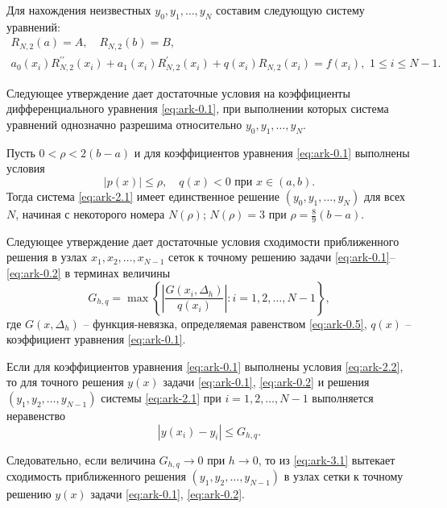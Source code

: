 Для нахождения неизвестных $y_0,y_1,\dots,y_N$ составим следующую систему уравнений:
\begin{equation}\label{eq:ark-2.1}
\begin{array}{lcl}
R_{N,2}(a)=A, \quad R_{N,2}(b)=B,\\
a_0(x_i)R^{\prime\prime}_{N,2}(x_i)+a_1(x_i)R^\prime_{N,2}(x_i)+q(x_i)R_{N,2}(x_i)=f(x_i),
\,\, 1\leqslant i\leqslant N-1.
\end{array}
\end{equation}

Следующее утверждение дает достаточные условия на коэффициенты дифференциального 
уравнения \eqref{eq:ark-0.1},
при выполнении которых система уравнений однозначно разрешима относительно 
$y_0,y_1,\dots,y_N$.

\begin{theorem} \label{th:ark-theo2}
Пусть $0<\rho<2(b-a)$ и для коэффициентов уравнения \eqref{eq:ark-0.1} выполнены условия
\begin{equation}\label{eq:ark-2.2}
|p(x)|\leqslant \rho,\quad q(x)<0 \text{ при } x\in (a,b).
\end{equation}
Тогда система \eqref{eq:ark-2.1} имеет единственное решение $(y_0,y_1,\dots,y_N)$ для
всех $N$, начиная с некоторого номера $N(\rho)$; $N(\rho)=3$ при $\rho=\frac 89 (b-a)$.
\end{theorem}

Следующее утверждение дает достаточные условия сходимости приближенного решения
в узлах $x_1,x_2, \dots,x_{N-1}$ сеток к точному решению задачи \eqref{eq:ark-0.1}--\eqref{eq:ark-0.2}
в терминах величины
$$
G_{h,q}=\max\left\{\left|\frac{G(x_i,\Delta_h)}{q(x_i)}\right|: i=1,2,\dots,N-1\right\},
$$
где $G(x,\Delta_h)$ -- функция-невязка, определяемая равенством \eqref{eq:ark-0.5}, $q(x)$ -- 
коэффициент уравнения \eqref{eq:ark-0.1}.

\begin{theorem} \label{th:ark-theo3}
Если для коэффициентов уравнения \eqref{eq:ark-0.1} выполнены условия \eqref{eq:ark-2.2}, то для 
точного решения $y(x)$ задачи \eqref{eq:ark-0.1}, \eqref{eq:ark-0.2} и решения $(y_1,y_2,\dots,y_{N-1})$
системы \eqref{eq:ark-2.1} при $i=1,2,\dots,N-1$ выполняется неравенство
\begin{equation}\label{eq:ark-3.1}
|y(x_i)-y_i|\leqslant G_{h,q}.
\end{equation}
\end{theorem}

Следовательно, если величина $G_{h,q}\to 0$ при $h\to 0$, то из \eqref{eq:ark-3.1} вытекает сходимость
приближенного решения $(y_1,y_2,\dots,y_{N-1})$ в узлах сетки к точному решению
$y(x)$ задачи \eqref{eq:ark-0.1}, \eqref{eq:ark-0.2}.

